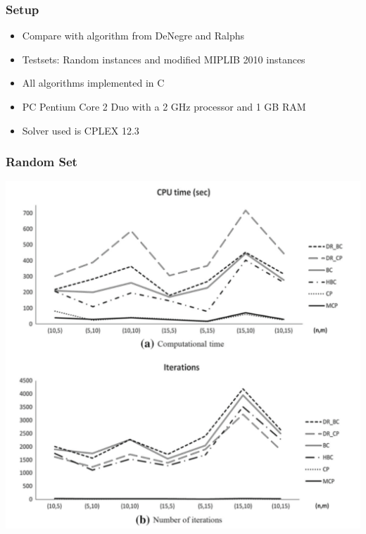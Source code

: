 \documentclass[11pt]{beamer}
\begin{document}
\begin{frame}
	\frametitle{Setup}
	\begin{itemize}
		\item Compare with algorithm from DeNegre and Ralphs
		\item Testsets: Random instances and modified MIPLIB 2010 instances
		\item All algorithms implemented in C
		\item PC Pentium Core 2 Duo with a 2 GHz processor and 1 GB RAM
		\item Solver used is CPLEX 12.3
	\end{itemize}
\end{frame}
\begin{frame}
	\frametitle{Random Set}
\centering
\includegraphics[height=0.8\textheight]{run-times_2.pdf}
\end{frame}
\end{document}
